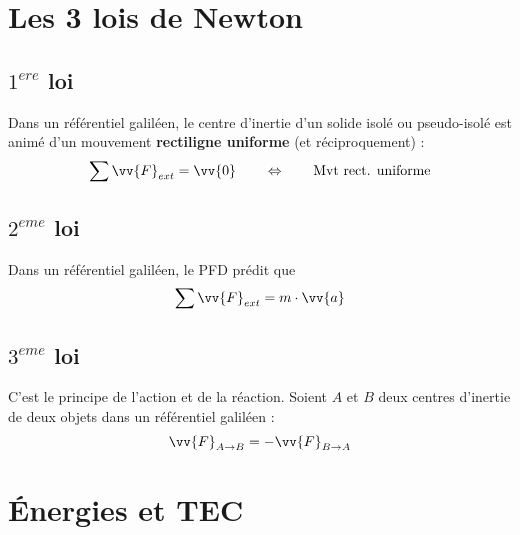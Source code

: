 \documentclass[main.tex]{subfiles}
\begin{document}
\section{Les 3 lois de Newton}

\subsection{$1^{ere}$ loi}

\begin{Definition}
    Dans un référentiel galiléen, le centre d'inertie d'un solide isolé ou pseudo-isolé est animé d'un mouvement \textbf{rectiligne uniforme} (et réciproquement) :
    $$\sum \vv{F}_{ext} = \vv{0} \qquad \Leftrightarrow \qquad \text{Mvt rect. uniforme}$$
\end{Definition}


\subsection{$2^{eme}$ loi}

\begin{Definition}
    Dans un référentiel galiléen, le PFD prédit que
    $$\sum \vv{F}_{ext} = m\cdot \vv{a} $$
\end{Definition}

\subsection{$3^{eme}$ loi}

\begin{Definition}
    C'est le principe de l'action et de la réaction. Soient $A$ et $B$ deux centres d'inertie de deux objets dans un référentiel galiléen :
    $$\vv{F}_{A\rightarrow B} = - \vv{F}_{B\rightarrow A}$$
\end{Definition}


\section{Énergies et TEC}
\end{document}
